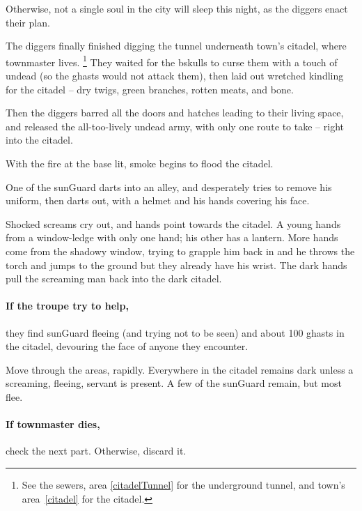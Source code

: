 Otherwise, not a single soul in the city will sleep this night, as the \glspl{digger} enact their plan.

\begin{exampletext}
  The \glspl{digger} finally finished digging the tunnel underneath \gls{town}'s citadel, where \gls{townmaster} lives.%
  \footnote{See the sewers, \gls{area} \vref{citadelTunnel} for the underground tunnel, and \gls{town}'s \gls{area}~\vref{citadel} for the citadel.}
  They waited for the \gls{bskulls} to curse them with a touch of undead (so the ghasts would not attack them), then laid out wretched kindling for the citadel -- dry twigs, green branches, rotten meats, and bone.

  Then the \glspl{digger} barred all the doors and hatches leading to their living space, and released the all-too-lively undead army, with only one route to take -- right into the citadel.

  With the fire at the base lit, smoke begins to flood the citadel.
\end{exampletext}

\begin{boxtext}
  One of the \gls{sunGuard} darts into an alley, and desperately tries to remove his uniform, then darts out, with a helmet and his hands covering his face.

  Shocked screams cry out, and hands point towards the citadel.
  A young hands from a window-ledge with only one hand; his other has a lantern.
  More hands come from the shadowy window, trying to grapple him back in and he throws the torch and jumps to the ground but they already have his wrist.
  The dark hands pull the screaming man back into the dark citadel.
\end{boxtext}

\paragraph{If the troupe try to help,}
they find \gls{sunGuard} fleeing (and trying not to be seen) and about 100 ghasts in the citadel, devouring the face of anyone they encounter.

Move through the areas, rapidly.
Everywhere in the citadel remains dark unless a screaming, fleeing, servant is present.
A few of the \gls{sunGuard} remain, but most flee.


\paragraph{If \gls{townmaster} dies,}
check the next part.
Otherwise, discard it.

